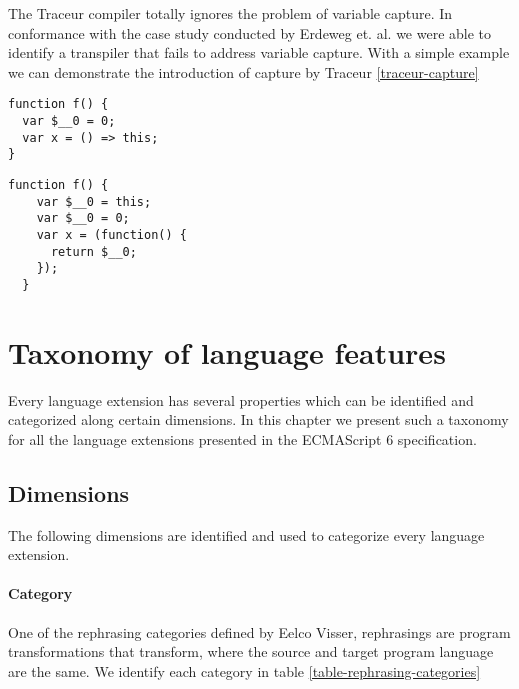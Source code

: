 The Traceur compiler totally ignores the problem of variable capture. In conformance with the case study conducted by Erdeweg et. al. \cite{Erdweg2014} we were able to identify a transpiler that fails to address variable capture. With a simple example we can demonstrate the introduction of capture by Traceur \ref{traceur-capture}

\begin{lstlisting}[label=traceur-capture, caption=Example input to Traceur\protect\footnotemark]
function f() {
  var $__0 = 0;
  var x = () => this; 
}
\end{lstlisting}

\begin{lstlisting}[caption=Variable capture]
function f() {
    var $__0 = this;
    var $__0 = 0;
    var x = (function() {
      return $__0;
    });
  }
\end{lstlisting}

\section{Taxonomy of language features} \label{taxonomy}

Every language extension has several properties which can be identified and categorized along certain dimensions. In this chapter we present such a taxonomy for all the language extensions presented in the ECMAScript 6 specification\cite{SpecJS}.

\subsection{Dimensions}
The following dimensions are identified and used to categorize every language extension.

\paragraph{Category}
One of the rephrasing categories defined by Eelco Visser\cite{Visser2001}, rephrasings are program transformations that transform, where the source and target program language are the same. We identify each category in table \ref{table-rephrasing-categories}

